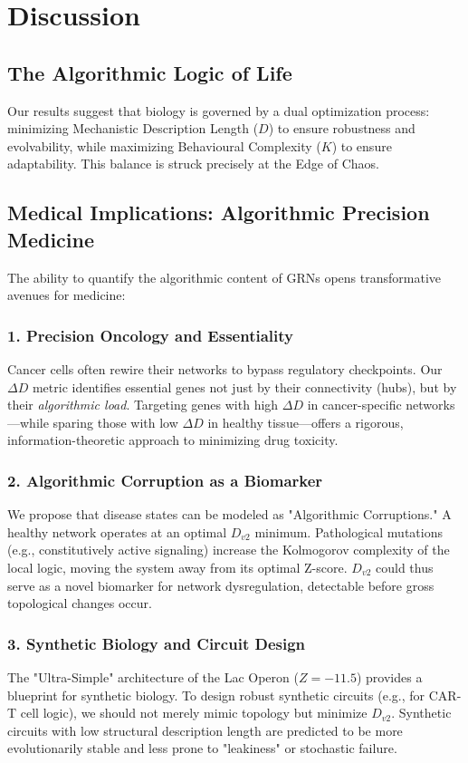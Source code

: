 \documentclass{article}
\begin{document}
\section{Discussion}

\subsection{The Algorithmic Logic of Life}
Our results suggest that biology is governed by a dual optimization process: minimizing Mechanistic Description Length ($D$) to ensure robustness and evolvability, while maximizing Behavioural Complexity ($K$) to ensure adaptability. This balance is struck precisely at the Edge of Chaos.

\subsection{Medical Implications: Algorithmic Precision Medicine}
The ability to quantify the algorithmic content of GRNs opens transformative avenues for medicine:

\subsubsection{1. Precision Oncology and Essentiality}
Cancer cells often rewire their networks to bypass regulatory checkpoints. Our $\Delta D$ metric identifies essential genes not just by their connectivity (hubs), but by their \textit{algorithmic load}. Targeting genes with high $\Delta D$ in cancer-specific networks—while sparing those with low $\Delta D$ in healthy tissue—offers a rigorous, information-theoretic approach to minimizing drug toxicity.

\subsubsection{2. Algorithmic Corruption as a Biomarker}
We propose that disease states can be modeled as "Algorithmic Corruptions." A healthy network operates at an optimal $D_{v2}$ minimum. Pathological mutations (e.g., constitutively active signaling) increase the Kolmogorov complexity of the local logic, moving the system away from its optimal Z-score. $D_{v2}$ could thus serve as a novel biomarker for network dysregulation, detectable before gross topological changes occur.

\subsubsection{3. Synthetic Biology and Circuit Design}
The "Ultra-Simple" architecture of the Lac Operon ($Z=-11.5$) provides a blueprint for synthetic biology. To design robust synthetic circuits (e.g., for CAR-T cell logic), we should not merely mimic topology but minimize $D_{v2}$. Synthetic circuits with low structural description length are predicted to be more evolutionarily stable and less prone to "leakiness" or stochastic failure.
\end{document}
